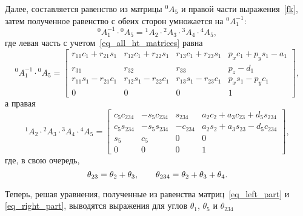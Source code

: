 Далее, составляется равенство из матрицы ${}^0A_5$ и правой части выражения~\eqref{fk}, затем полученное равенство с обеих сторон умножается на ${}^0A_1^{-1}$:
\begin{equation}
	{}^0A_1^{-1} \cdot {}^0A_5 = {}^1A_2 \cdot {}^2A_3 \cdot {}^3A_4 \cdot {}^4A_5,
\end{equation}
где левая часть с учетом~\eqref{eq_all_ht_matrices} равна
\begin{equation}\label{eq_left_part}
	{}^0A_1^{-1} \cdot {}^0A_5 =
	\left[\begin{matrix}
		r_{11} c_{1} + r_{21} s_{1} & r_{12} c_{1} + r_{22} s_{1} & r_{13} c_{1} + r_{23} s_{1} &  p_{x} c_{1} + p_{y} s_{1} - a_{1}\\
		r_{31} & r_{32} & r_{33} & p_{z} - d_{1}\\
		r_{11} s_{1} - r_{21} c_{1} & r_{12} s_{1} - r_{22} c_{1} & r_{13} s_{1} - r_{23} c_{1} & p_{x} s_{1} - p_{y} c_{1}\\
		0 & 0 & 0 & 1\end{matrix}\right]\!\!,
\end{equation}
а правая
\begin{equation}\label{eq_right_part}
	{}^1A_2 \cdot {}^2A_3 \cdot {}^3A_4 \cdot {}^4A_5 =
	\left[\begin{matrix}
		c_{5} c_{234} & - s_{5} c_{234} & s_{234} & a_{2} c_{2} + a_{3} c_{23} + d_{5} s_{234}\\
		c_{5} s_{234} & - s_{5} s_{234} & - c_{234} & a_{2} s_{2} + a_{3} s_{23} - d_{5} c_{234}\\
		s_{5} & c_{5} & 0 & 0\\
		0 & 0 & 0 & 1
	\end{matrix}\right]\!\!,
\end{equation}
где, в свою очередь,
\begin{equation}\label{eq_theta_23_234}
    \theta_{23} = \theta_2 + \theta_3,
    \qquad
    \theta_{234} = \theta_2 + \theta_3 + \theta_4\ldotp
\end{equation}

Теперь, решая уравнения, полученные из равенства матриц~\eqref{eq_left_part} и \eqref{eq_right_part}, выводятся выражения для углов $\theta_1$, $\theta_5$ и $\theta_{234}$

